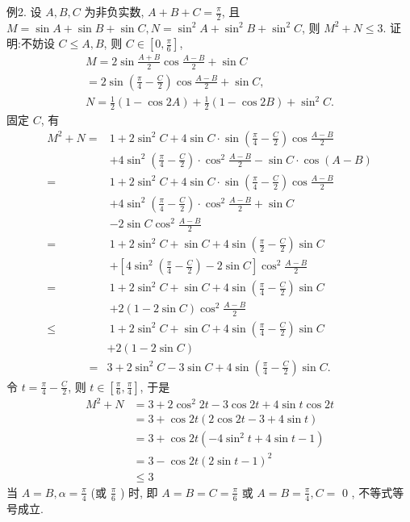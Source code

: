 例2. 设 $A, B, C$ 为非负实数, $A+B+C=\frac{\pi}{2}$, 且 $M=\sin A+\sin B+ \sin C, N=\sin ^2 A+\sin ^2 B+\sin ^2 C$, 则 $M^2+N \leqslant 3$.
证明:不妨设 $C \leqslant A, B$, 则 $C \in\left[0, \frac{\pi}{6}\right]$,
$$
\begin{gathered}
M=2 \sin \frac{A+B}{2} \cos \frac{A-B}{2}+\sin C \\
=2 \sin \left(\frac{\pi}{4}-\frac{C}{2}\right) \cos \frac{A-B}{2}+\sin C, \\
N=\frac{1}{2}(1-\cos 2 A)+\frac{1}{2}(1-\cos 2 B)+\sin ^2 C .
\end{gathered}
$$
固定 $C$, 有
$$
\begin{aligned}
M^2+N= & 1+2 \sin ^2 C+4 \sin C \cdot \sin \left(\frac{\pi}{4}-\frac{C}{2}\right) \cos \frac{A-B}{2} \\
& +4 \sin ^2\left(\frac{\pi}{4}-\frac{C}{2}\right) \cdot \cos ^2 \frac{A-B}{2}-\sin C \cdot \cos (A-B) \\
= & 1+2 \sin ^2 C+4 \sin C \cdot \sin \left(\frac{\pi}{4}-\frac{C}{2}\right) \cos \frac{A-B}{2} \\
& +4 \sin ^2\left(\frac{\pi}{4}-\frac{C}{2}\right) \cdot \cos ^2 \frac{A-B}{2}+\sin C \\
& -2 \sin C \cos ^2 \frac{A-B}{2} \\
= & 1+2 \sin ^2 C+\sin C+4 \sin \left(\frac{\pi}{2}-\frac{C}{2}\right) \sin C \\
& +\left[4 \sin ^2\left(\frac{\pi}{4}-\frac{C}{2}\right)-2 \sin C\right] \cos ^2 \frac{A-B}{2} \\
= & 1+2 \sin ^2 C+\sin C+4 \sin \left(\frac{\pi}{4}-\frac{C}{2}\right) \sin C \\
& +2(1-2 \sin C) \cos ^2 \frac{A-B}{2} \\
\leqslant & 1+2 \sin ^2 C+\sin C+4 \sin \left(\frac{\pi}{4}-\frac{C}{2}\right) \sin C
\end{aligned}
$$
$$
\begin{aligned}
& +2(1-2 \sin C) \\
= & 3+2 \sin ^2 C-3 \sin C+4 \sin \left(\frac{\pi}{4}-\frac{C}{2}\right) \sin C .
\end{aligned}
$$
令 $t=\frac{\pi}{4}-\frac{C}{2}$, 则 $t \in\left[\frac{\pi}{6}, \frac{\pi}{4}\right]$, 于是
$$
\begin{aligned}
M^2+N & =3+2 \cos ^2 2 t-3 \cos 2 t+4 \sin t \cos 2 t \\
& =3+\cos 2 t(2 \cos 2 t-3+4 \sin t) \\
& =3+\cos 2 t\left(-4 \sin ^2 t+4 \sin t-1\right) \\
& =3-\cos 2 t(2 \sin t-1)^2 \\
& \leqslant 3
\end{aligned}
$$
当 $A=B, \alpha=\frac{\pi}{4}$ (或 $\frac{\pi}{6}$ ) 时, 即 $A=B=C=\frac{\pi}{6}$ 或 $A=B=\frac{\pi}{4}, C=$ 0 , 不等式等号成立.



